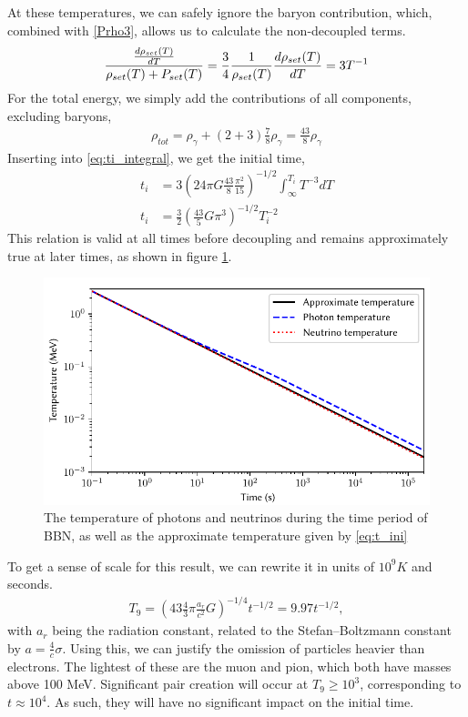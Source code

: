 At these temperatures, we can safely ignore the baryon contribution, which, combined with \eqref{Prho3}, allows us to calculate the non-decoupled terms.
\begin{align}
    \frac{\frac{d\rho_{set}(T)}{dT}}{\rho_{set}(T) + P_{set}(T)}=\frac{3}{4}\frac{1}{\rho_{set}(T)}\frac{d\rho_{set}(T)}{dT}=3T^{-1}
\end{align}
For the total energy, we simply add the contributions of all components, excluding baryons,
\begin{align}
    \rho_{tot}=\rho_\gamma+(2+3)\frac{7}{8}\rho_\gamma=\frac{43}{8}\rho_\gamma
\end{align}
Inserting into \eqref{eq:ti_integral}, we get the initial time,
\begin{align}
    t_i&=3(24\pi G\frac{43}{8}\frac{\pi^2}{15})^{-1/2}\int_{\infty}^{T_i}T^{-3}dT\\
    t_i&=\frac{3}{2}( \frac{43}{5}G\pi^3)^{-1/2}T_i^{-2}
    \label{eq:t_ini}
\end{align}
This relation is valid at all times before decoupling and remains approximately true at later times, as shown in figure \ref{fig:Temperature}.
\begin{figure}[ht]
    \includegraphics[width=5.1in]{figures/Temperature.pdf}
    \caption{The temperature of photons and neutrinos during the time period of BBN, as well as the approximate temperature given by \eqref{eq:t_ini}}
    \label{fig:Temperature}
\end{figure}

To get a sense of scale for this result, we can rewrite it in units of $10^9K$ and seconds.
\begin{align}
    T_9=( 43 \frac{4}{3}\pi\frac{a_r}{c^2}G)^{-1/4}t^{-1/2}=9.97t^{-1/2},
    \label{eq:T9_ini}
\end{align}
with $a_r$ being the radiation constant, related to the Stefan–Boltzmann constant by $a=\frac{4}{c}\sigma$. 
Using this, we can justify the omission of particles heavier than electrons. The lightest of these are the muon and pion, which both have masses above 100 MeV. Significant pair creation will occur at $T_9 \geq 10^3$, corresponding to $t\approx10^4$. As such, they will have no significant impact on the initial time. 


